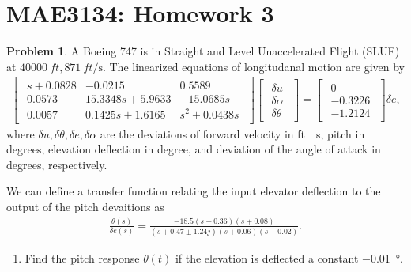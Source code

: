 \documentclass[10pt]{article}
\date{}
\theoremstyle{definition}
\newtheorem{prob}{Problem}[section]
\newenvironment{subprob}%
{\renewcommand{\theenumi}{\alph{enumi}}\renewcommand{\labelenumi}{(\theenumi)}\begin{enumerate}}%
{\end{enumerate}}%
\begin{document}
\pagestyle{empty}
\section*{MAE3134: Homework 3}
\vspace*{-0.4cm}
\begin{prob}
    A Boeing 747 is in Straight and Level Unaccelerated Flight (SLUF) at \( \SI{40000}{ft}, \SI{871}{ft \per \second}\).
    The linearized equations of longitudanal motion are given by
    \begin{align}
        \begin{bmatrix}
            \begin{array}{ccc}
                s + 0.0828 & -0.0215 & 0.5589 \\
                0.0573 & 15.3348s + 5.9633 & -15.0685s \\
                0.0057 & 0.1425s + 1.6165 & s^2 + 0.0438s
            \end{array}
        \end{bmatrix}
        \begin{bmatrix}
            \begin{array}{c}
                \delta u \\ \delta \alpha \\ \delta \theta
            \end{array}
        \end{bmatrix}
        =
        \begin{bmatrix}
            \begin{array}{c}
                0 \\ -0.3226 \\ -1.2124
            \end{array}
        \end{bmatrix}
        \delta e ,
    \end{align}
    where \( \delta u, \delta \theta, \delta e, \delta \alpha\) are the deviations of forward velocity in \si{ft \per \second}, pitch in degrees, elevation deflection in degree, and deviation of the angle of attack in degrees, respectively.

We can define a transfer function relating the input elevator deflection to the output of the pitch devaitions as
\begin{align}
    \frac{\theta(s)}{\delta e(s)} = \frac{-18.5 (s + 0.36) (s+0.08)}{(s + 0.47 \pm 1.24 j)(s+0.06)(s+0.02)} .
\end{align}

\begin{subprob}
    \item Find the pitch response \( \theta (t) \) if the elevation is deflected a constant \SI{-0.01}{\degree}.
\end{subprob}
\end{prob}
\end{document}
